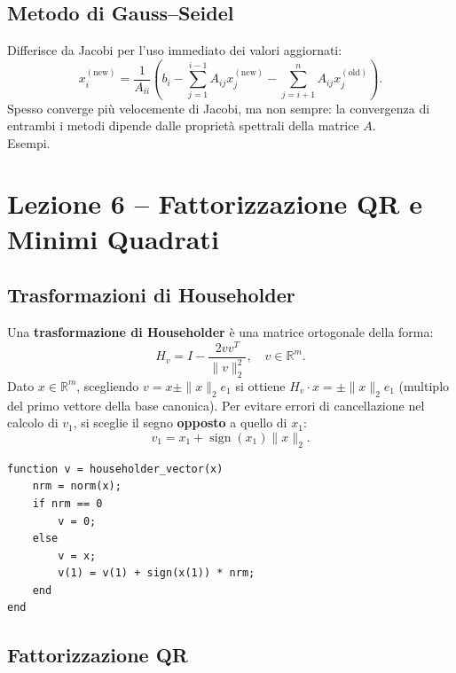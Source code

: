 \documentclass[12pt,a4paper,]{report}
\begin{document}
\subsection{Metodo di Gauss--Seidel}

Differisce da Jacobi per l'uso immediato dei valori aggiornati:
\[
  x_i^{(\text{new})} = \frac{1}{A_{ii}} \left( b_i
    - \sum_{j=1}^{i-1} A_{ij} x_j^{(\text{new})}
    - \sum_{j=i+1}^{n} A_{ij} x_j^{(\text{old})} \right).
\]
Spesso converge più velocemente di Jacobi, ma non sempre: la convergenza di
entrambi i metodi dipende dalle proprietà spettrali della matrice $A$.\\
Esempi.

\section{Lezione 6 -- Fattorizzazione QR e Minimi Quadrati}

\subsection{Trasformazioni di Householder}

Una \textbf{trasformazione di Householder} è una matrice ortogonale della forma:
\[
  H_v = I - \frac{2vv^T}{\|v\|_2^2}, \quad v \in \mathbb{R}^m.
\]
Dato $x \in \mathbb{R}^m$, scegliendo $v = x \pm \|x\|_2 e_1$ si ottiene
$H_v \cdot x = \pm\|x\|_2 e_1$ (multiplo del primo vettore della base canonica).
Per evitare errori di cancellazione nel calcolo di $v_1$, si sceglie il segno
\textbf{opposto} a quello di $x_1$:
\[
  v_1 = x_1 + \operatorname{sign}(x_1)\|x\|_2.
\]
\begin{lstlisting}
function v = householder_vector(x)
    nrm = norm(x);
    if nrm == 0
        v = 0;
    else
        v = x;
        v(1) = v(1) + sign(x(1)) * nrm;
    end
end
\end{lstlisting}

\subsection{Fattorizzazione QR}
\end{document}
